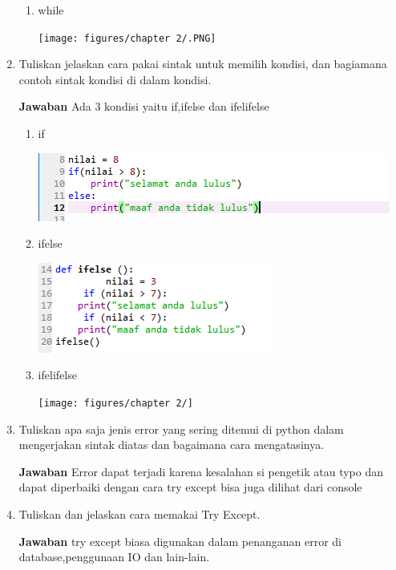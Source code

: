 \begin{enumerate}
\begin{enumerate}
        \item while
    \begin{center}
        \centering
        \texttt{[image: figures/chapter 2/.PNG]}
    \end{center}
    \end{enumerate}
\item
Tuliskan jelaskan cara pakai sintak untuk memilih kondisi, dan bagiamana contoh sintak kondisi di dalam kondisi.
\par\textbf{Jawaban} Ada 3 kondisi yaitu if,ifelse dan ifelifelse
\begin{enumerate}
    \item if
    \begin{center}
        \centering
        \includegraphics[scale=1]{figures/chapter 2/11.PNG}
    \end{center}
    
        \item ifelse
    \begin{center}
        \centering
        \includegraphics[scale=1.5]{figures/chapter 2/12.PNG}
    \end{center}
    
            \item ifelifelse
    \begin{center}
        \centering
        \texttt{[image: figures/chapter 2/]}
    \end{center}
\end{enumerate}
\item
Tuliskan apa saja jenis error yang sering ditemui di python dalam mengerjakan sintak diatas dan bagaimana cara mengatasinya.
\par\textbf{Jawaban} Error dapat terjadi karena kesalahan si pengetik atau typo dan dapat diperbaiki dengan cara try except bisa juga dilihat dari console
\item
Tuliskan dan jelaskan cara memakai Try Except.
\par\textbf{Jawaban} try except biasa digunakan dalam penanganan error di database,penggunaan IO dan lain-lain.


\end{enumerate}
